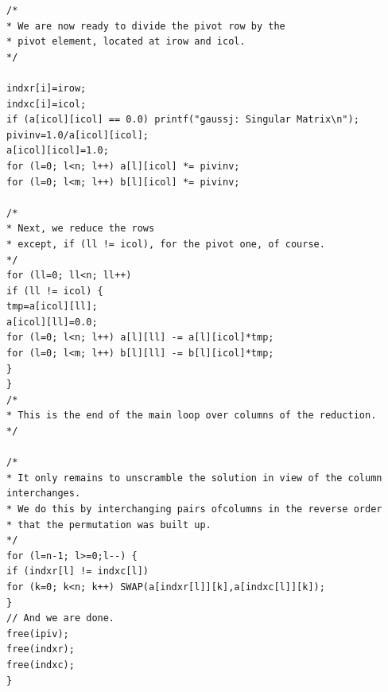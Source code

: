 \begin{verbatim}
/*
* We are now ready to divide the pivot row by the
* pivot element, located at irow and icol.
*/

indxr[i]=irow;
indxc[i]=icol;
if (a[icol][icol] == 0.0) printf("gaussj: Singular Matrix\n");
pivinv=1.0/a[icol][icol];
a[icol][icol]=1.0;
for (l=0; l<n; l++) a[l][icol] *= pivinv;
for (l=0; l<m; l++) b[l][icol] *= pivinv;

/*
* Next, we reduce the rows
* except, if (ll != icol), for the pivot one, of course.
*/
for (ll=0; ll<n; ll++)
if (ll != icol) {
tmp=a[icol][ll];
a[icol][ll]=0.0;
for (l=0; l<n; l++) a[l][ll] -= a[l][icol]*tmp;
for (l=0; l<m; l++) b[l][ll] -= b[l][icol]*tmp;
}
}
/*
* This is the end of the main loop over columns of the reduction.
*/

/*
* It only remains to unscramble the solution in view of the column interchanges.
* We do this by interchanging pairs ofcolumns in the reverse order
* that the permutation was built up.
*/
for (l=n-1; l>=0;l--) {
if (indxr[l] != indxc[l])
for (k=0; k<n; k++) SWAP(a[indxr[l]][k],a[indxc[l]][k]);
}
// And we are done.
free(ipiv);
free(indxr);
free(indxc);
}
\end{verbatim}
